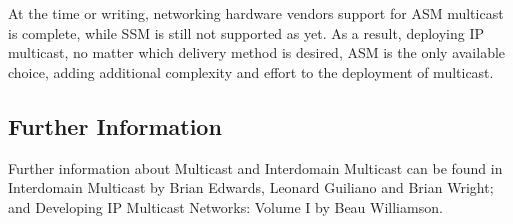 At the time or writing, networking hardware vendors support for ASM
multicast is complete, while SSM is still not supported as yet. As a
result, deploying IP multicast, no matter which delivery method is
desired, ASM is the only available choice, adding additional complexity
and effort to the deployment of multicast.

\subsection{Further Information}

Further information about Multicast and Interdomain Multicast can be
found in Interdomain Multicast by Brian Edwards, Leonard Guiliano and
Brian Wright; and Developing IP Multicast Networks: Volume I by Beau
Williamson.
